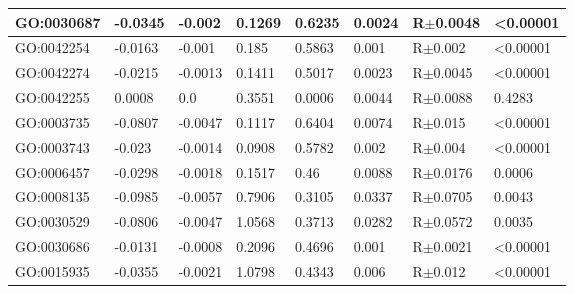 \documentclass[a4,center]{NAR} %
\begin{document}
\begin{table}[h]
{\begin{tabular} {|l|l|l|l|l|l|l|l|}
\hline
GO:0030687&-0.0345&-0.002&0.1269&0.6235&0.0024&R$\pm$0.0048&\textless 0.00001\\
\hline
GO:0042254&-0.0163&-0.001&0.185&0.5863&0.001&R$\pm$0.002&\textless 0.00001\\
\hline
GO:0042274&-0.0215&-0.0013&0.1411&0.5017&0.0023&R$\pm$0.0045&\textless 0.00001\\
\hline
GO:0042255&0.0008&  0.0   &  0.3551 & 0.0006&  0.0044&  R$\pm$0.0088  &0.4283    \\
\hline
GO:0003735 & -0.0807& -0.0047 &0.1117 & 0.6404&  0.0074  &R$\pm$0.015 &  \textless 0.00001  \\
\hline
GO:0003743 & -0.023 & -0.0014& 0.0908 & 0.5782 & 0.002&   R$\pm$0.004  & \textless 0.00001 \\
\hline
GO:0006457&-0.0298& -0.0018& 0.1517&  0.46 &  0.0088 &R$\pm$0.0176  & 0.0006 \\
\hline
GO:0008135&-0.0985& -0.0057 &0.7906&  0.3105&  0.0337 & R$\pm$0.0705  &  0.0043 \\
\hline
GO:0030529&-0.0806& -0.0047& 1.0568 & 0.3713&  0.0282 & R$\pm$0.0572  & 0.0035  \\
\hline
GO:0030686&-0.0131& -0.0008& 0.2096 & 0.4696 &0.001 &  R$\pm$0.0021  &\textless 0.00001 \\
\hline
GO:0015935&-0.0355& -0.0021 &1.0798 & 0.4343 & 0.006  & R$\pm$0.012   & \textless 0.00001  \\
\hline
\end{tabular}%
}

\end{table}
\end{document}
